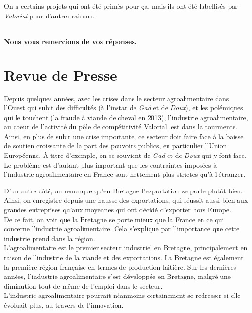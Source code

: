 \documentclass[a4paper,12pt]{report}
\begin{document}
    On a certains projets qui ont été primés pour ça, mais ils ont été labellisés par \textit{Valorial} pour d’autres raisons.

	\textbf{\\Nous vous remercions de vos réponses.}


\chapter{Revue de Presse}
\label{RevuePresse}

	Depuis quelques années, avec les crises dans le secteur agroalimentaire dans l’Ouest qui subit des difficultés (à l’instar de \textit{Gad} et de \textit{Doux}), et les polémiques qui le touchent (la fraude à viande de cheval en 2013), l’industrie agroalimentaire, au coeur de l’activité du pôle de compétitivité Valorial, est dans la tourmente.\\

	Ainsi, en plus de subir une crise importante, ce secteur doit faire face à la baisse de soutien croissante de la part des pouvoirs publics, en particulier l’Union Européenne. À titre d’exemple, on se souvient de \textit{Gad} et de \textit{Doux} qui y font face. Le problème est d’autant plus important que les contraintes imposées à l’industrie agroalimentaire en France sont nettement plus strictes qu’à l’étranger.
	
	D’un autre côté, on remarque qu’en Bretagne l’exportation se porte plutôt bien. Ainsi, on enregistre depuis une hausse des exportations, qui réussit aussi bien aux grandes entreprises qu’aux moyennes qui ont décidé d’exporter hors Europe.\\

	De ce fait, on voit que la Bretagne se porte mieux que la France en ce qui concerne l’industrie agroalimentaire. Cela s’explique par l’importance que cette industrie prend dans la région.\\

	L’agroalimentaire est le premier secteur industriel en Bretagne, principalement en raison de l’industrie de la viande et des exportations. La Bretagne est également la première région française en termes de production laitière. Sur les dernières années, l’industrie agroalimentaire s’est développée en Bretagne, malgré une diminution tout de même de l’emploi dans le secteur.\\

	L’industrie agroalimentaire pourrait néanmoins certainement se redresser si elle évoluait plus, au travers de l’innovation.\\
\end{document}

